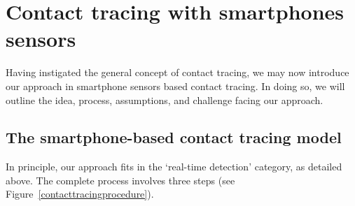 \documentclass[graybox]{svmult}
\begin{document}
\section{Contact tracing with smartphones sensors}
Having instigated the general concept of contact tracing, we may now introduce our approach in smartphone sensors based contact tracing. In doing so, we will outline the idea, process, assumptions, and challenge facing our approach.

\subsection{The smartphone-based contact tracing model}
\label{sec:model}
In principle, our approach fits in the `real-time detection' category, as detailed above. The complete process involves three steps (see Figure~\ref{contacttracingprocedure}).
\end{document}
